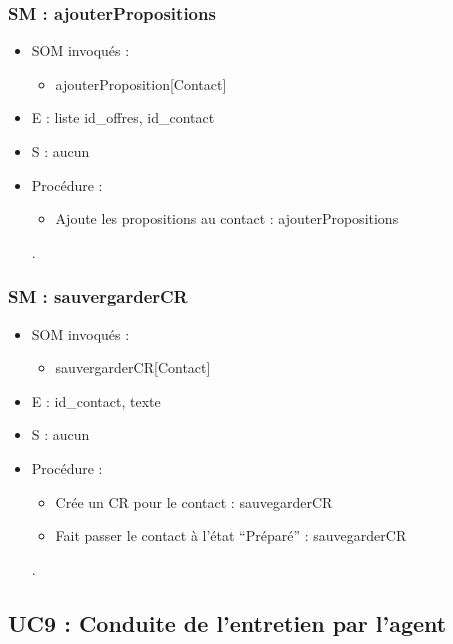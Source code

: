 \subsubsection{SM : ajouterPropositions}
\begin{itemize}
	\item SOM invoqués :
	\begin{itemize}
		\item ajouterProposition[Contact]
	\end{itemize}
	\item E : liste id\_offres, id\_contact
	\item S : aucun
	\item Procédure :
	\begin{itemize}
		\item Ajoute les propositions au contact : ajouterPropositions
	\end{itemize}.
\end{itemize}

\subsubsection{SM : sauvergarderCR}
\begin{itemize}
	\item SOM invoqués :
	\begin{itemize}
		\item sauvergarderCR[Contact]
	\end{itemize}
	\item E : id\_contact, texte
	\item S : aucun
	\item Procédure :
	\begin{itemize}
		\item Crée un CR pour le contact : sauvegarderCR
		\item Fait passer le contact à l’état “Préparé” : sauvegarderCR
	\end{itemize}.
\end{itemize}



\subsection{UC9 : Conduite de l’entretien par l’agent}
